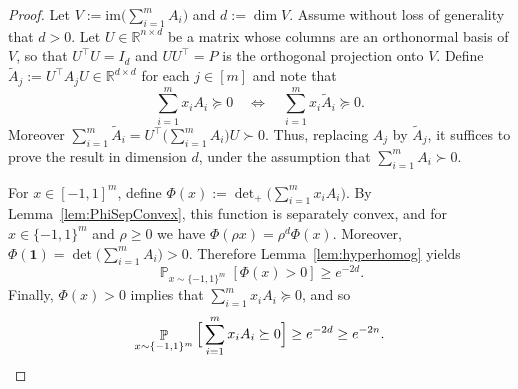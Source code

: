 \documentclass[12pt,english]{article}
\theoremstyle{theorem}
\theoremstyle{remark}
\providecommand{\setR}{\mathbb{R}}
\newcommand{\detplus}{\textstyle{\det_+}}
\renewcommand{\Pr}{\mathop{\mathbb{P}}}
\begin{document}
\begin{proof}
Let $V:=\mathrm{im}\Big(\sum_{i=1}^m A_i\Big)$ and $d:=\dim V$. Assume without loss of generality that $d>0$. Let $U \in \mathbb{R}^{n \times d}$ be a matrix whose columns are an orthonormal basis of $V$, so that $U^\top U=I_d$ and $UU^\top = P$ is the orthogonal projection onto $V$. Define $\widetilde A_j:=U^\top A_j U\in\setR^{d\times d}$ for each $j \in [m]$ and note that
\[
\sum_{i=1}^m x_iA_i\succeq0
\quad\Longleftrightarrow\quad
\sum_{i=1}^m x_i\widetilde A_i\succeq0.
\]
Moreover $\sum_{i=1}^m\widetilde A_i = U^\top\Big(\sum_{i=1}^m A_i\Big)U \succ0$. Thus, replacing $A_j$ by $\widetilde A_j$, it suffices to prove the result in dimension $d$, under the assumption that $\sum_{i=1}^m A_i\succ0$.

For \(x\in[-1,1]^m\), define $\Phi(x):=\detplus\Big(\sum_{i=1}^m x_iA_i\Big)$. By Lemma~\ref{lem:PhiSepConvex}, this function is separately convex, and for $x\in\{-1,1\}^m$ and $\rho\geq0$ we have  $\Phi(\rho x)=\rho^d\Phi(x)$. Moreover, $\Phi(\bm{1})=\det\Big(\sum_{i=1}^m A_i\Big)>0$.
Therefore Lemma~\ref{lem:hyperhomog} yields
\[
\Pr_{x\sim\{-1,1\}^m}[\Phi(x)>0]
\geq e^{-2d}.
\]
Finally, \(\Phi(x)>0\) implies that \(\sum_{i=1}^m x_iA_i\succeq0\), and so
\[
\Pr_{x\sim\{-1,1\}^m}
\Big[\sum_{i=1}^m x_iA_i\succeq0\Big]
\geq e^{-2d}\geq e^{-2n}. \qedhere
\]
\end{proof}

\end{document}
